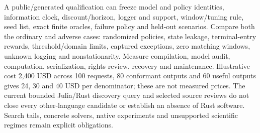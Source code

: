 A public/generated qualification can freeze model and policy identities,
information clock, discount/horizon, logger and support, window/tuning rule,
seed list, exact finite oracles, failure policy and held-out scenarios. Compare
both the ordinary and adverse cases: randomized policies, state leakage,
terminal-entry rewards, threshold/domain limits, captured exceptions, zero
matching windows, unknown logging and nonstationarity. Measure compilation,
model audit, computation, serialization, rights review, recovery and maintenance.
Illustrative cost 2,400 USD across 100 requests, 80 conformant outputs and
60 useful outputs gives 24, 30 and 40 USD per denominator; these are not measured
prices. The current bounded Julia/Rust discovery query and selected source
reviews do not close every other-language candidate or establish an absence
of Rust software. Search tails, concrete solvers, native experiments and
unsupported scientific regimes remain explicit obligations.
\citep{exec24_policyother_contract}
